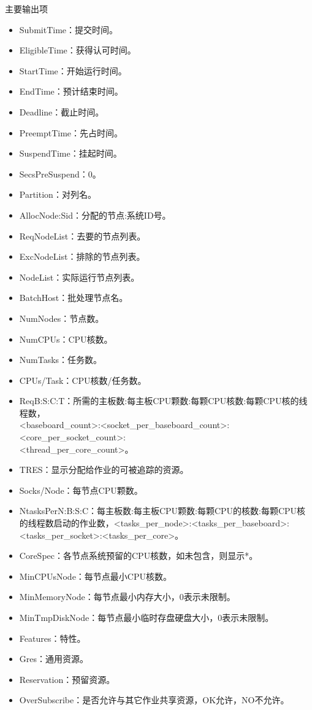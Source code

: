 \begin{frame}{主要输出项}
\begin{itemize}
	\item SubmitTime：提交时间。
	\item EligibleTime：获得认可时间。
	\item StartTime：开始运行时间。
	\item EndTime：预计结束时间。
	\item Deadline：截止时间。
	\item PreemptTime：先占时间。
	\item SuspendTime：挂起时间。
	\item SecsPreSuspend：0。
	\item Partition：对列名。
	\item AllocNode:Sid：分配的节点:系统ID号。
	\item ReqNodeList：去要的节点列表。
	\item ExcNodeList：排除的节点列表。
	\item NodeList：实际运行节点列表。
	\item BatchHost：批处理节点名。
	\item NumNodes：节点数。
	\item NumCPUs：CPU核数。
	\item NumTasks：任务数。
	\item CPUs/Task：CPU核数/任务数。
	\item ReqB:S:C:T：所需的主板数:每主板CPU颗数:每颗CPU核数:每颗CPU核的线程数，\\<baseboard\_count>:<socket\_per\_baseboard\_count>:<core\_per\_socket\_count>:\\<thread\_per\_core\_count>。
	\item TRES：显示分配给作业的可被追踪的资源。
	\item Socks/Node：每节点CPU颗数。
	\item NtasksPerN:B:S:C：每主板数:每主板CPU颗数:每颗CPU的核数:每颗CPU核的线程数启动的作业数，<tasks\_per\_node>:<tasks\_per\_baseboard>:<tasks\_per\_socket>:<tasks\_per\_core>。
	\item CoreSpec：各节点系统预留的CPU核数，如未包含，则显示*。
	\item MinCPUsNode：每节点最小CPU核数。
	\item MinMemoryNode：每节点最小内存大小，0表示未限制。
	\item MinTmpDiskNode：每节点最小临时存盘硬盘大小，0表示未限制。
	\item Features：特性。
	\item Gres：通用资源。
	\item Reservation：预留资源。
	\item OverSubscribe：是否允许与其它作业共享资源，OK允许，NO不允许。

\end{itemize}
\end{frame}
